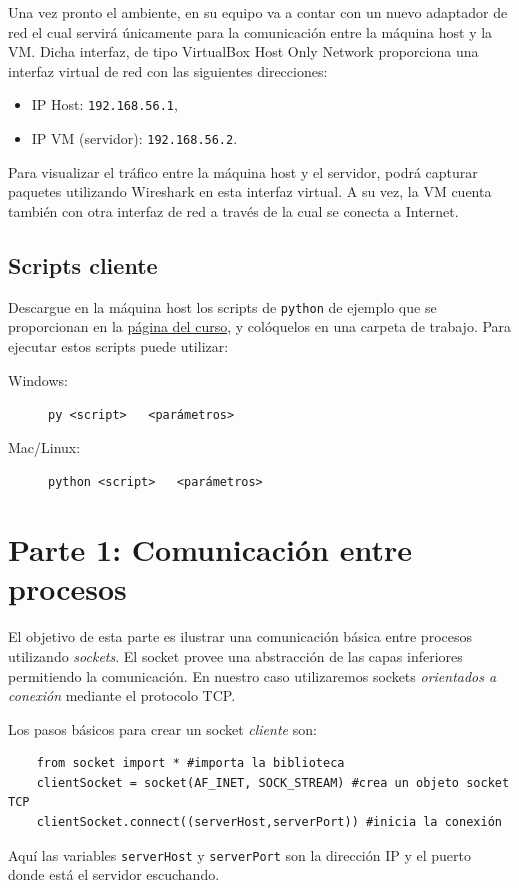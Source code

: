 \documentclass[a4paper,10pt]{article}
\begin{document}
Una vez pronto el ambiente, en su equipo va a contar con un nuevo adaptador de red el cual servirá únicamente para la comunicación entre la máquina host y la VM. Dicha interfaz, de tipo VirtualBox Host Only Network proporciona una interfaz virtual de red con las siguientes direcciones:
\begin{itemize}
    \item IP Host: \texttt{192.168.56.1},
    \item IP VM (servidor): \texttt{192.168.56.2}.
\end{itemize}
Para visualizar el tráfico entre la máquina host y el servidor, podrá capturar paquetes utilizando Wireshark en esta interfaz virtual. A su vez, la VM cuenta también con otra interfaz de red a través de la cual se conecta a Internet.

\subsection*{Scripts cliente}

Descargue en la máquina host los scripts de \texttt{python} de ejemplo que se proporcionan en la \href{https://aulas.ort.edu.uy/course/view.php?id=5210}{página del curso}, y colóquelos en una carpeta de trabajo. Para ejecutar estos scripts puede utilizar:
\begin{description}
    \item[Windows:] \texttt{py <script> \, <parámetros>}
    \item[Mac/Linux:] \texttt{python <script> \, <parámetros>}
\end{description}

\section*{Parte 1: Comunicación entre procesos}

El objetivo de esta parte es ilustrar una comunicación básica entre procesos utilizando \emph{sockets}. El socket provee una abstracción de las capas inferiores permitiendo la comunicación. En nuestro caso utilizaremos sockets \emph{orientados a conexión} mediante el protocolo TCP.

Los pasos básicos para crear un socket \emph{cliente} son:
\begin{verbatim}
    from socket import * #importa la biblioteca
    clientSocket = socket(AF_INET, SOCK_STREAM) #crea un objeto socket TCP
    clientSocket.connect((serverHost,serverPort)) #inicia la conexión
\end{verbatim}
Aquí las variables \texttt{serverHost} y \texttt{serverPort} son la dirección IP y el puerto donde está el servidor escuchando.
\end{document}
